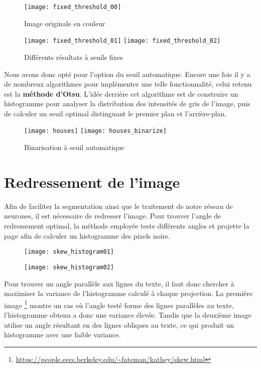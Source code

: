 \begin{figure}[H]
    \centering
    \texttt{[image: fixed\_threshold\_00]}
    \caption{Image originale en couleur}
\end{figure}

\begin{figure}[H]
    \centering
    \texttt{[image: fixed\_threshold\_01]}
    \texttt{[image: fixed\_threshold\_02]}
    \caption{Différents résultats à seuils fixes}
\end{figure}

Nous avons donc opté pour l'option du seuil automatique. Encore une fois il y a
de nombreux algorithmes pour implémenter une telle fonctionnalité, celui retenu
est la \textbf{méthode d'Otsu}. L'idée derrière cet algorithme est de construire
un histogramme pour analyser la distribution des intensités de gris de l'image,
puis de calculer un seuil optimal distinguant le premier plan et l'arrière-plan.

\begin{figure}[H]
    \centering
    \texttt{[image: houses]}
    \texttt{[image: houses\_binarize]}
    \caption{Binarisation à seuil automatique}
\end{figure}

\newpage

\section{Redressement de l'image}

Afin de faciliter la segmentation ainsi que le traitement de notre réseau de
neurones, il est nécessaire de redresser l'image. Pour trouver l'angle de
redressement optimal, la méthode employée teste différents angles et projette la
page afin de calculer un histogramme des pixels noirs.

\begin{figure}[H]
    \centering
    \texttt{[image: skew\_histogram01]}
\end{figure}

\begin{figure}[H]
    \centering
    \texttt{[image: skew\_histogram02]}
\end{figure}

Pour trouver un angle parallèle aux lignes du texte, il faut donc chercher à
maximiser la variance de l'histogramme calculé à chaque projection. La première
image
\footnote{\url{https://people.eecs.berkeley.edu/~fateman/kathey/skew.html}}
montre un cas où l'angle testé forme des lignes parallèles au texte,
l'histogramme obtenu a donc une variance élevée. Tandis que la deuxième image
utilise un angle résultant en des lignes obliques au texte, ce qui produit un
histogramme avec une faible variance.

